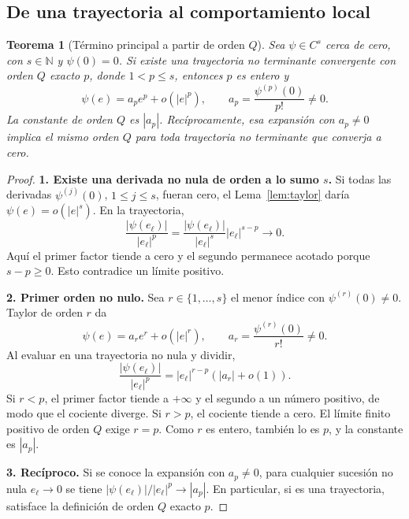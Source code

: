 \documentclass[11pt,a4paper]{article}
\numberwithin{equation}{section}
\newtheorem{theorem}{Teorema}[section]
\theoremstyle{definition}
\theoremstyle{remark}
\newcommand{\N}{\mathbb N}
\newcommand{\paso}[1]{\par\smallskip\noindent\textbf{#1}\quad}
\begin{document}
\subsection{De una trayectoria al comportamiento local}
\begin{theorem}[Término principal a partir de orden $Q$]\label{thm:Qprincipal}
Sea $\psi\in C^s$ cerca de cero, con $s\in\N$ y $\psi(0)=0$. Si existe una trayectoria no terminante convergente con orden $Q$ exacto $p$, donde $1<p\le s$, entonces $p$ es entero y
\[
\psi(e)=a_pe^p+o(|e|^p),\qquad
 a_p=\frac{\psi^{(p)}(0)}{p!}\ne0.
\]
La constante de orden $Q$ es $|a_p|$. Recíprocamente, esa expansión con $a_p\ne0$ implica el mismo orden $Q$ para toda trayectoria no terminante que converja a cero.
\end{theorem}
\begin{proof}
\paso{1. Existe una derivada no nula de orden a lo sumo $s$.}
Si todas las derivadas $\psi^{(j)}(0)$, $1\le j\le s$, fueran cero, el Lema~\ref{lem:taylor} daría $\psi(e)=o(|e|^s)$. En la trayectoria,
\[
\frac{|\psi(e_\ell)|}{|e_\ell|^p}
=\frac{|\psi(e_\ell)|}{|e_\ell|^s}|e_\ell|^{s-p}\longrightarrow0.
\]
Aquí el primer factor tiende a cero y el segundo permanece acotado porque $s-p\ge0$. Esto contradice un límite positivo.

\paso{2. Primer orden no nulo.}
Sea $r\in\{1,\ldots,s\}$ el menor índice con $\psi^{(r)}(0)\ne0$. Taylor de orden $r$ da
\[
\psi(e)=a_re^r+o(|e|^r),\qquad a_r=\frac{\psi^{(r)}(0)}{r!}\ne0.
\]
Al evaluar en una trayectoria no nula y dividir,
\[
\frac{|\psi(e_\ell)|}{|e_\ell|^p}
=|e_\ell|^{r-p}(|a_r|+o(1)).
\]
Si $r<p$, el primer factor tiende a $+\infty$ y el segundo a un número positivo, de modo que el cociente diverge. Si $r>p$, el cociente tiende a cero. El límite finito positivo de orden $Q$ exige $r=p$. Como $r$ es entero, también lo es $p$, y la constante es $|a_p|$.

\paso{3. Recíproco.}
Si se conoce la expansión con $a_p\ne0$, para cualquier sucesión no nula $e_\ell\to0$ se tiene $|\psi(e_\ell)|/|e_\ell|^p\to|a_p|$. En particular, si es una trayectoria, satisface la definición de orden $Q$ exacto $p$.
\end{proof}
\end{document}
